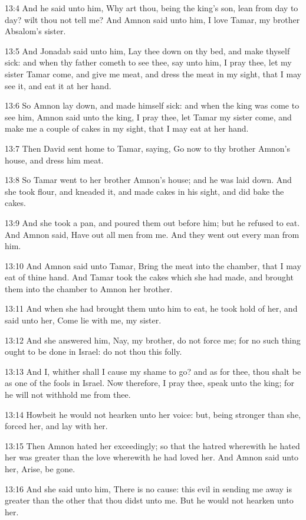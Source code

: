 13:4 And he said unto him, Why art thou, being the king's son, lean
from day to day? wilt thou not tell me? And Amnon said unto him, I
love Tamar, my brother Absalom's sister.

13:5 And Jonadab said unto him, Lay thee down on thy bed, and make
thyself sick: and when thy father cometh to see thee, say unto him, I
pray thee, let my sister Tamar come, and give me meat, and dress the
meat in my sight, that I may see it, and eat it at her hand.

13:6 So Amnon lay down, and made himself sick: and when the king was
come to see him, Amnon said unto the king, I pray thee, let Tamar my
sister come, and make me a couple of cakes in my sight, that I may eat
at her hand.

13:7 Then David sent home to Tamar, saying, Go now to thy brother
Amnon's house, and dress him meat.

13:8 So Tamar went to her brother Amnon's house; and he was laid down.
And she took flour, and kneaded it, and made cakes in his sight, and
did bake the cakes.

13:9 And she took a pan, and poured them out before him; but he
refused to eat. And Amnon said, Have out all men from me. And they
went out every man from him.

13:10 And Amnon said unto Tamar, Bring the meat into the chamber, that
I may eat of thine hand. And Tamar took the cakes which she had made,
and brought them into the chamber to Amnon her brother.

13:11 And when she had brought them unto him to eat, he took hold of
her, and said unto her, Come lie with me, my sister.

13:12 And she answered him, Nay, my brother, do not force me; for no
such thing ought to be done in Israel: do not thou this folly.

13:13 And I, whither shall I cause my shame to go? and as for thee,
thou shalt be as one of the fools in Israel. Now therefore, I pray
thee, speak unto the king; for he will not withhold me from thee.

13:14 Howbeit he would not hearken unto her voice: but, being stronger
than she, forced her, and lay with her.

13:15 Then Amnon hated her exceedingly; so that the hatred wherewith
he hated her was greater than the love wherewith he had loved her. And
Amnon said unto her, Arise, be gone.

13:16 And she said unto him, There is no cause: this evil in sending
me away is greater than the other that thou didst unto me. But he
would not hearken unto her.

